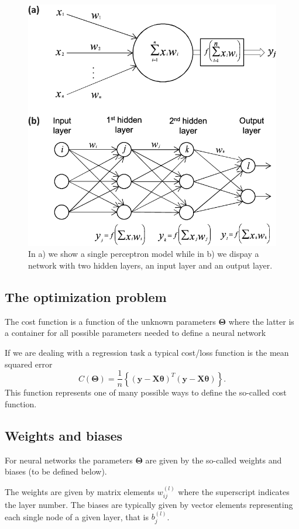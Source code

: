 \documentclass[%
oneside,                 %
final,                   %
10pt]{article}
\begin{document}
\begin{figure}[!ht]  %
  \centerline{\includegraphics[width=0.7\linewidth]{figures/nns.png}}
  \caption{
  In a) we show a single perceptron model while in b) we dispay a network with two  hidden layers, an input layer and an output layer.
  }
\end{figure}

\subsection{The optimization problem}

The cost function is a function of the unknown parameters
$\bm{\Theta}$ where the latter is a container for all possible
parameters needed to define a neural network

If we are dealing with a regression task a typical cost/loss function
is the mean squared error
\[
C(\bm{\Theta})=\frac{1}{n}\left\{\left(\bm{y}-\bm{X}\bm{\theta}\right)^T\left(\bm{y}-\bm{X}\bm{\theta}\right)\right\}.
\]
This function represents one of many possible ways to define
the so-called cost function.

\subsection{Weights and biases}

For neural networks the parameters
$\bm{\Theta}$ are given by the so-called weights and biases (to be
defined below).

The weights are given by matrix elements $w_{ij}^{(l)}$ where the
superscript indicates the layer number. The biases are typically given
by vector elements representing each single node of a given layer,
that is $b_j^{(l)}$.
\end{document}
